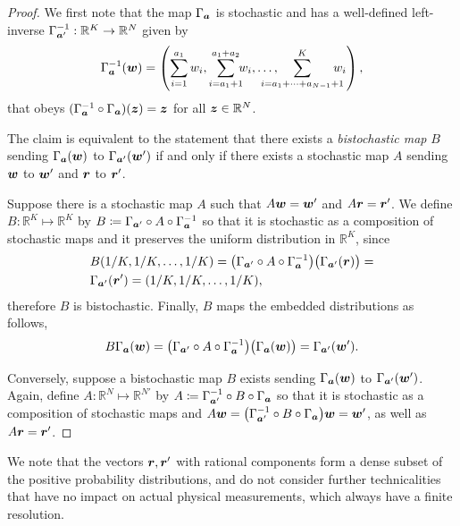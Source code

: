 \documentclass[pra,
aps,
twocolumn,
superscriptaddress,
groupedaddress,
nofootinbib,
reprint
]{revtex4-1}
\begin{document}
\begin{proof}
	We first note that the map $\Gamma_{\bm{a}}$ is stochastic and has a well-defined left-inverse $\Gamma^{-1}_{\bm{a}'}: \mathbb{R}^K \rightarrow \mathbb{R}^N$ given by
\begin{equation}
	\Gamma^{-1}_{\bma}(\w) = \left( \sum_{i=1}^{a_1} w_i,  \sum_{i = a_1 +1}^{a_1 + a_2} \hspace{-5pt} w_i, \dots , \hspace{-15pt} \sum_{i=a_1 + \dots + a_{N-1}+1}^{K} \hspace{-10pt} w_i \right),
\end{equation}
that obeys $(\Gamma^{-1}_{\bm{a}} \circ \Gamma_{\bm{a}}) (\bm{z}) = \bm{z}$ for all $\bm{z} \in \mathbb{R}^N$. 

The claim is equivalent to the statement that there exists a \emph{bistochastic map} $B$ sending $\Gamma_{\bm{a}}(\boldsymbol{w})$ to $\Gamma_{\bm{a}'}(\boldsymbol{w}')$ if and only if there exists a stochastic map $A$ sending $\boldsymbol{w}$ to $\boldsymbol{w}'$ and $\boldsymbol{r}$ to $\boldsymbol{r}'$.

Suppose there is a stochastic map $A$ such that $A\boldsymbol{w}=\boldsymbol{w}'$ and $A\boldsymbol{r} = \boldsymbol{r}'$. 
We define $B:\mathbb{R}^K \mapsto \mathbb{R}^K$ by $B \coloneqq \Gamma_{\bm{a}'} \circ A \circ \Gamma_{\bm{a}}^{-1}$ so that it is stochastic as a composition of stochastic maps and it preserves the uniform distribution in $\mathbb{R}^K$, since
\begin{align}
	&B(1/K, 1/K, \dots, 1/K) = \big( \Gamma_{\bm{a}'} \circ A \circ \Gamma_{\bm{a}}^{-1} \big) \big( \Gamma_{\bm{a}'}(\boldsymbol{r}) \big) = \nonumber\\
	&\Gamma_{\bm{a}'} (\boldsymbol{r}') = (1/K, 1/K, \dots, 1/K),
\end{align}
therefore $B$ is bistochastic.
Finally, $B$ maps the embedded distributions as follows,
\begin{equation}
	B \Gamma_{\bm{a}}(\boldsymbol{w}) = \big( \Gamma_{\bm{a}'} \circ A \circ \Gamma_{\bm{a}}^{-1} \big) \big( \Gamma_{\bm{a}}(\boldsymbol{w}) \big) = \Gamma_{\bm{a}'} (\boldsymbol{w}').
\end{equation}

Conversely, suppose a bistochastic map $B$ exists sending $\Gamma_{\bm{a}}(\boldsymbol{w})$ to $\Gamma_{\bm{a}'}(\boldsymbol{w}')$. Again, define $A: \mathbb{R}^N \mapsto \mathbb{R}^{N'}$ by $A \coloneqq \Gamma_{\bm{a}'}^{-1} \circ B \circ \Gamma_{\bm{a}}$ so that it is stochastic as a composition of stochastic maps and $A \boldsymbol{w} = \big( \Gamma_{\bm{a}'}^{-1} \circ B \circ \Gamma_{\bm{a}} \big) \boldsymbol{w} = \boldsymbol{w}'$, as well as $A \boldsymbol{r} = \boldsymbol{r}'$.
\end{proof}
We note that the vectors $\boldsymbol{r}, \boldsymbol{r}'$ with rational components form a dense subset of the positive probability distributions, and do not consider further technicalities that have no impact on actual physical measurements, which always have a finite resolution.
\end{document}
